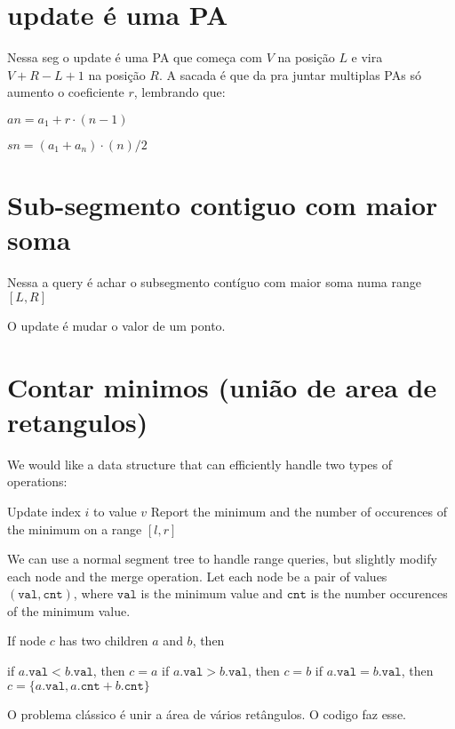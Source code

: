     
    \section{update é uma PA}
    Nessa seg o update é uma PA que começa com $V$ na posição $L$ e vira $V + R-L+1$ na posição $R$.
    A sacada é que da pra juntar multiplas PAs só aumento o coeficiente $r$, lembrando que:
    
    $an = a_1 + r \cdot (n-1)$
    
    $sn = (a_1 + a_n) \cdot (n) / 2$

    
    \section{Sub-segmento contiguo com maior soma}

    Nessa a query é achar o subsegmento contíguo com maior soma numa range $[L,R]$

    O update é mudar o valor de um ponto.
    

    \section{Contar minimos (união de area de retangulos)}

    We would like a data structure that can efficiently handle two types of operations:

    Update index $i$ to value $v$
    Report the minimum and the number of occurences of the minimum on a range $[l, r]$
    
    
    We can use a normal segment tree to handle range queries, but slightly modify each node and the merge operation. Let each node be a pair of values $(\texttt{val}, \texttt{cnt})$, where $\texttt{val}$ is the minimum value and $\texttt{cnt}$ is the number occurences of the minimum value.
    
    If node $c$ has two children $a$ and $b$, then
    
    if $a.\texttt{val} < b.\texttt{val}$, then $c = a$
    if $a.\texttt{val} > b.\texttt{val}$, then $c = b$
    if $a.\texttt{val} = b.\texttt{val}$, then $c = \{a.\texttt{val}, a.\texttt{cnt} + b.\texttt{cnt}\}$

    O problema clássico é unir a área de vários retângulos. O codigo faz esse.
    

